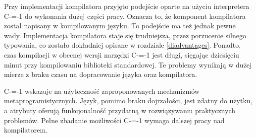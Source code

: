 Przy implementacji kompilatora przyjęto podejście oparte na użyciu interpretera C-=-1 do wykonania dużej części pracy.
Oznacza to, że komponent kompilatora został napisany w kompilowanym języku.
To podejście ma też jednak pewne wady.
Implementacja kompilatora staje się trudniejsza, przez porzucenie silnego typowania, co zostało dokładniej opisane w rozdziale \ref{diadvantages}.
Ponadto, czas kompilacji w obecnej wersji narzędzi C-=-1 jest długi, sięgając dziesięciu minut przy kompilowaniu biblioteki standardowej.
Te problemy wynikają w dużej mierze z braku czasu na dopracowanie języka oraz kompilatora.

C-=-1 wskazuje na użyteczność zaproponowanych mechanizmów metaprogramistycznych.
Język, pomimo braku dojrzałości, jest zdatny do użytku, a atrybuty oferują funkcjonalność przydatną w rozwiązywaniu praktycznych problemów.
Pełne zbadanie możliwości C-=-1 wymaga dalszej pracy nad kompilatorem.

